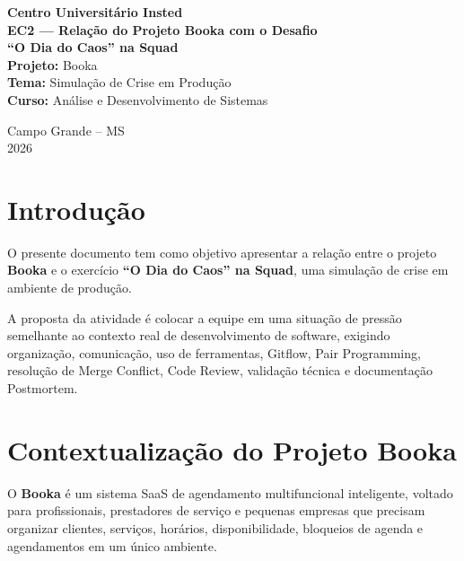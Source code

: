 \documentclass[12pt,a4paper]{article}
\begin{document}
\begin{titlepage}
    \begin{center}
        \vspace*{2cm}

        {\Large \textbf{Centro Universitário Insted}}\\[2cm]

        {\Large \textbf{EC2 — Relação do Projeto Booka com o Desafio}}\\[0.5cm]
        {\large \textbf{``O Dia do Caos'' na Squad}}\\[3cm]

        \textbf{Projeto:} Booka\\
        \textbf{Tema:} Simulação de Crise em Produção\\
        \textbf{Curso:} Análise e Desenvolvimento de Sistemas\\[3cm]

        \vfill

        Campo Grande -- MS\\
        2026
    \end{center}
\end{titlepage}

\tableofcontents
\newpage

\section{Introdução}

O presente documento tem como objetivo apresentar a relação entre o projeto \textbf{Booka} e o exercício \textbf{``O Dia do Caos'' na Squad}, uma simulação de crise em ambiente de produção.

A proposta da atividade é colocar a equipe em uma situação de pressão semelhante ao contexto real de desenvolvimento de software, exigindo organização, comunicação, uso de ferramentas, Gitflow, Pair Programming, resolução de Merge Conflict, Code Review, validação técnica e documentação Postmortem.

\section{Contextualização do Projeto Booka}

O \textbf{Booka} é um sistema SaaS de agendamento multifuncional inteligente, voltado para profissionais, prestadores de serviço e pequenas empresas que precisam organizar clientes, serviços, horários, disponibilidade, bloqueios de agenda e agendamentos em um único ambiente.
\end{document}
